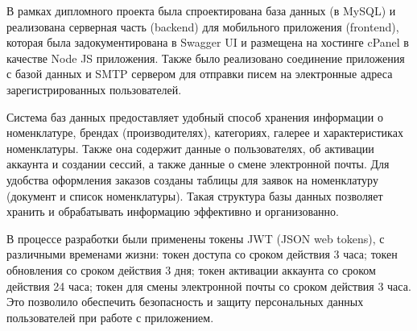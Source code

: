 В рамках дипломного проекта была спроектирована база данных (в MySQL) и реализована серверная часть (backend)
для мобильного приложения (frontend),
которая была задокументирована в Swagger UI и размещена на хостинге cPanel в качестве Node JS приложения.
Также было реализовано соединение приложения с базой данных
и SMTP сервером для отправки писем на электронные адреса зарегистрированных пользователей.

Система баз данных предоставляет удобный способ хранения информации о номенклатуре, брендах (производителях),
категориях, галерее и характеристиках номенклатуры.
Также она содержит данные о пользователях, об активации аккаунта и создании сессий,
а также данные о смене электронной почты.
Для удобства оформления заказов созданы таблицы для заявок на номенклатуру (документ и список номенклатуры).
Такая структура базы данных позволяет хранить и обрабатывать информацию эффективно и организованно.




В процессе разработки были применены токены JWT (JSON web tokens), с различными временами жизни:
токен доступа со сроком действия 3 часа;
токен обновления со сроком действия 3 дня;
токен активации аккаунта со сроком действия 24 часа;
токен для смены электронной почты со сроком действия 3 часа.
Это позволило обеспечить безопасность и защиту персональных данных пользователей при работе с приложением.
